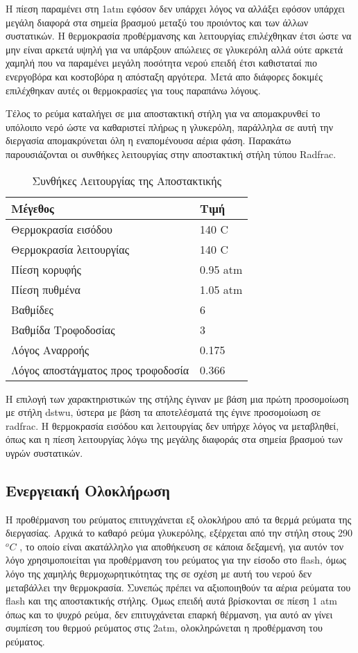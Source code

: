 \documentclass[11pt]{article}
\begin{document}
Η πίεση παραμένει στη 1atm εφόσον δεν υπάρχει λόγος να αλλάξει εφόσον
υπάρχει μεγάλη διαφορά στα σημεία βρασμού μεταξύ του προιόντος και των
άλλων συστατικών. Η θερμοκρασία προθέρμανσης και λειτουργίας επιλέχθηκαν
έτσι ώστε να μην είναι αρκετά υψηλή για να υπάρξουν απώλειες σε
γλυκερόλη αλλά ούτε αρκετά χαμηλή που να παραμένει μεγάλη ποσότητα
νερού επειδή έτσι καθισταταί πιο ενεργοβόρα και κοστοβόρα η απόσταξη
αργότερα. Μετά απο διάφορες δοκιμές επιλέχθηκαν αυτές οι θερμοκρασίες
για τους παραπάνω λόγους.

Τέλος το ρεύμα καταλήγει σε μια αποστακτική στήλη για να απομακρυνθεί το
υπόλοιπο νερό ώστε να καθαριστεί πλήρως η γλυκερόλη, παράλληλα σε
αυτή την διεργασία απομακρύνεται όλη η εναπομένουσα αέρια φάση. Παρακάτω
παρουσιάζονται οι συνθήκες λειτουργίας στην αποστακτική στήλη τύπου
Radfrac.

\begin{table}[htbp]
\caption{Συνθήκες Λειτουργίας της Αποστακτικής}
\centering
\begin{tabular}{ll}
Μέγεθος & Τιμή\\
\hline
Θερμοκρασία εισόδου & 140 C\\
Θερμοκρασία λειτουργίας & 140 C\\
Πίεση κορυφής & 0.95 atm\\
Πίεση πυθμένα & 1.05 atm\\
Βαθμίδες & 6\\
Βαθμίδα Τροφοδοσίας & 3\\
Λόγος Αναρροής & 0.175\\
Λόγος αποστάγματος προς τροφοδοσία & 0.366\\
\end{tabular}
\end{table}

Η επιλογή των χαρακτηριστικών της στήλης έγιναν με βάση μια πρώτη
προσομοίωση με στήλη dstwu, ύστερα με βάση τα αποτελέσματά της έγινε
προσομοίωση σε radfrac. Η θερμοκρασία εισόδου και λειτουργίας δεν υπήρχε
λόγος να μεταβληθεί, όπως και η πίεση λειτουργίας λόγω της μεγάλης
διαφοράς στα σημεία βρασμού των υγρών συστατικών.

\subsection{Ενεργειακή Ολοκλήρωση}
\label{sec:orgfd1ea84}
Η προθέρμανση του ρεύματος επιτυγχάνεται εξ ολοκλήρου από τα θερμά
ρεύματα της διεργασίας. Αρχικά το καθαρό ρεύμα γλυκερόλης, εξέρχεται
από την στήλη στους 290\(^{o} C\) , το οποίο είναι ακατάλληλο για
αποθήκευση σε κάποια δεξαμενή, για αυτόν τον λόγο χρησιμοποιείται για
προθέρμανση του ρεύματος για την είσοδο στο flash, όμως λόγο της χαμηλής
θερμοχωρητικότητας της σε σχέση με αυτή του νερού δεν μεταβάλλει την θερμοκρασία. Συνεπώς πρέπει
να αξιοποιηθούν τα αέρια ρεύματα του flash και της αποστακτικής στήλης.
Όμως επειδή αυτά βρίσκονται σε πίεση 1 atm όπως και το ψυχρό ρεύμα, δεν
επιτυγχάνεται επαρκή θέρμανση, για αυτό αν γίνει συμπίεση του θερμού
ρεύματος στις 2atm, ολοκληρώνεται η προθέρμανση του ρεύματος.
\end{document}
